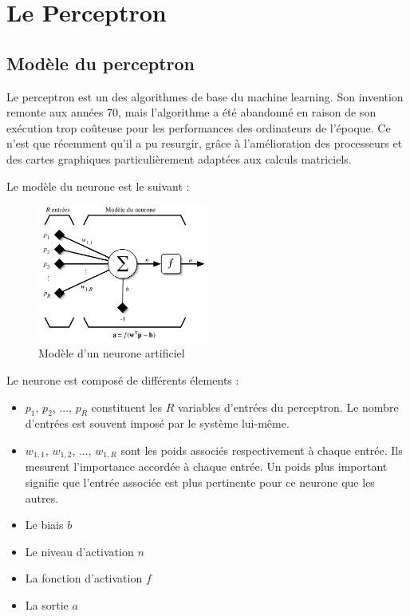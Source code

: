 \section{Le Perceptron}
\fancyhead[R]{\textit{\nouppercase{\leftmark}}}

\subsection{Modèle du perceptron}

Le perceptron est un des algorithmes de base du machine learning. Son invention remonte aux années 70, mais l'algorithme a été abandonné en 
raison de son exécution trop coûteuse pour les performances des ordinateurs de l’époque. Ce n’est que récemment qu’il a pu resurgir, grâce 
à l’amélioration des processeurs et des cartes graphiques particulièrement adaptées aux calculs matriciels.

Le modèle du neurone est le suivant : 

\begin{figure}[h]
 \centering
 \includegraphics[width=0.5\textwidth]{img/neurone.png}
 \caption{Modèle d'un neurone artificiel}
\end{figure}

Le neurone est composé de différents élements : 
\begin{itemize}
 \item $p_1$, $p_2$, ..., $p_R$ constituent les $R$ variables d'entrées du perceptron. Le nombre d'entrées est souvent imposé par le système lui-même.
 \item $w_{1,1}$, $w_{1,2}$, ..., $w_{1,R}$ sont les poids associés respectivement à chaque entrée. Ils mesurent l'importance accordée à chaque entrée. Un poids
 plus important signifie que l'entrée associée est plus pertinente pour ce neurone que les autres.
 \item Le biais $b$
 \item Le niveau d'activation $n$
 \item La fonction d'activation $f$
 \item La sortie $a$
\end{itemize}

